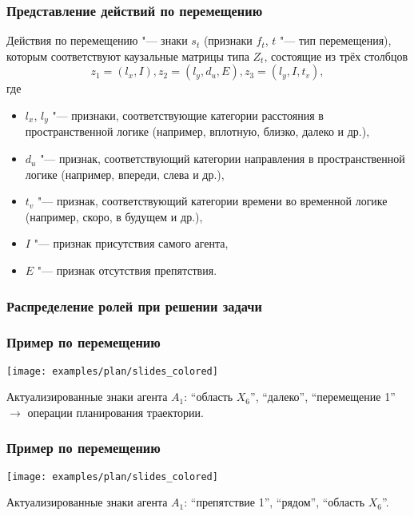 \documentclass[default]{beamer}
\begin{document}
	\begin{frame}
		\frametitle{Представление действий по перемещению}
		
		Действия по перемещению "--- знаки $s_t$ (признаки $f_t$, $t$ "--- тип перемещения), которым соответствуют каузальные матрицы типа $Z_t$, состоящие из трёх столбцов 
		\[
		z_1=(l_x, I), z_2=(l_y, d_u, E), z_3=(l_y, I, t_v),
		\]
		где 
		\begin{itemize}
		\item $l_x$, $l_y$ "--- признаки, соответствующие категории расстояния в пространственной логике  (например, вплотную, близко, далеко и др.), 
		\item $d_u$ "--- признак, соответствующий категории направления в пространственной логике (например, впереди, слева и др.), 
		\item $t_v$ "--- признак, соответствующий категории времени во временной логике (например, скоро, в будущем и др.),
		\item $I$ "--- признак присутствия самого агента, 
		\item $E$ "--- признак отсутствия препятствия.
		\end{itemize}
	\end{frame}	

	\begin{frame}
		\frametitle{Распределение ролей при решении задачи}
		\begin{center}
		\end{center}
	\end{frame}

	\begin{frame}
		\frametitle{Пример по перемещению}
		
		\begin{center}
		\texttt{[image: examples/plan/slides\_colored]}
		\end{center}
		\par\bigskip
		Актуализированные знаки агента $A_1$: ``область $X_6$'', ``далеко'', ``перемещение 1'' $\rightarrow$ \color{green!70!black} операции планирования траектории.
	\end{frame}

	\begin{frame}
		\frametitle{Пример по перемещению}
		
		\begin{center}
		\texttt{[image: examples/plan/slides\_colored]}
		\end{center}
		\par\bigskip
		Актуализированные знаки агента $A_1$: ``препятствие 1'', ``рядом'', ``область $X_6$''.
	\end{frame}
	
\end{document}
